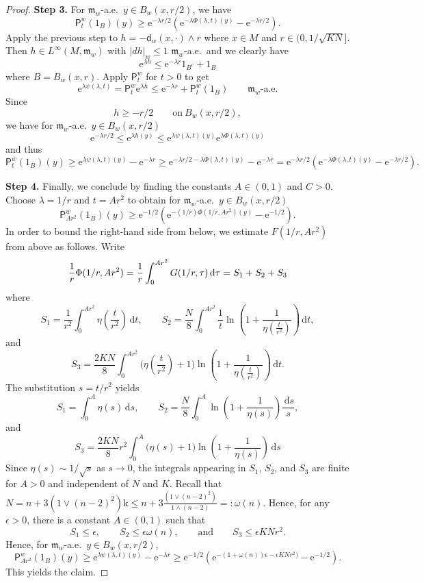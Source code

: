 \documentclass[10pt]{article}
\newcommand{\m}{\mathfrak{m}}
\newcommand{\M}{{\mathit{M}}}
\renewcommand{\d}{\,\mathrm{d}}
\newcommand{\e}{\mathrm{e}}
\renewcommand{\k}{\mathrm{k}}
\renewcommand{\P}{\mathsf{P}}
\newcommand{\One}{1}
\newcommand{\dist}{\mathsf{d}}
\theoremstyle{plain}
\theoremstyle{definition}
\begin{document}
\begin{proof}
\textbf{Step 3.} For $\m_w$-a.e.~$y\in B_w(x,r/2)$, we have  \[
\P_t^w(\One_B)(y)\geq \e^{-\lambda r/2}(\e^{-\lambda \Phi(\lambda,t)(y)}-\e^{-\lambda r/2 }).
\]
Apply the previous step to $h=-\dist_w(x,\cdot)\wedge r$ where $x \in M$ and $r \in (0,1/\sqrt{K N}]$. Then $h\in L^\infty(\M,\m_w)$ with $|dh|_w \le 1$ $\m_w$-a.e.~and we clearly have
\[
\e^{\lambda h}\leq \e^{-\lambda r}\One_{B^c}+\One_B
\]
where $B=B_w(x,r)$.  Apply $\P_t^w$ for $t>0$ to get 
\[
\e^{\lambda \psi(\lambda, t)}=\P_t^w\e^{\lambda h}\leq \e^{-\lambda r }+\P_t^w(\One_B) \qquad \text{$\m_w$-a.e.}
\]
Since
\[
h\geq -r/2 \qquad \text{on}\  B_w(x,r/2),
\]
we have for $\m_w$-a.e.~$y\in B_w(x,r/2)$
\[
\e^{-\lambda r/2}\leq \e^{\lambda h(y)}\leq \e^{\lambda\psi(\lambda,t)(y)}\e^{\lambda \Phi(\lambda,t)(y)}
\]
and thus
\[
\P_t^w(\One_B)(y)\geq \e^{\lambda \psi(\lambda, t)(y)}-\e^{-\lambda r }
\geq \e^{-\lambda r/2-\lambda \Phi(\lambda,t)(y)}-\e^{-\lambda r }
=\e^{-\lambda r/2}(\e^{-\lambda \Phi(\lambda,t)(y)}-\e^{-\lambda r/2 }).
\]

\textbf{Step 4.} Finally, we conclude by finding the constants $A\in(0,1)$ and $C>0$. Choose $\lambda=1/r$ and $t=Ar^2$ to obtain for $\m_w$-a.e.~$y\in B_w(x,r/2)$
\[
\P_{Ar^2}^w(\One_B)(y)
\geq\e^{- 1/2}(\e^{-(1/r) \Phi(1/r,Ar^2)(y)}-\e^{- 1/2 }).
\]
In order to bound the right-hand side from below, we estimate $F(1/r,Ar^2)$ from above as follows. Write
\[
    \frac{1}{r} \Phi(1/r,Ar^2)=\frac{1}{r}\int_0^{Ar^2}G(1/r,\tau)\d \tau
    \\
    =S_1+S_2+S_3
    \]
    where
    \[S_1=\frac{1}{r^2}\int_0^{Ar^2}
    \eta\left( \frac{t}{r^2}\right)\d t
    ,\qquad S_2=\frac{N}{8}\int_0^{Ar^2}\frac{1}{t}\ln\left(1+\frac{1}{\eta\left( \frac{t}{r^2}\right)}\right) \d t,\]
    and 
    \[
     S_3=\frac{2KN}{8}\int_0^{Ar^2}\bigg( \eta\left( \frac{t}{r^2}\right) +1 \bigg) \ln\left(1+\frac{1}{\eta\left( \frac{t}{r^2}\right)}\right)  \d t.
\]
The substitution $s=t/r^2$ yields 
\[
S_1=\int_{0}^{A}
    \eta(s) \d s
    ,\qquad S_2=\frac{N}{8}\int_0^A \ln \left(1 + \frac{1}{\eta(s)} \right) \frac{\d s}{s},
\]
and 
\[
     S_3=\frac{2KN}{8}r^2\int_0^{A}\bigg( \eta\left( s\right) +1 \bigg) \ln\left(1+\frac{1}{\eta\left(s\right)}\right)  \d s
\]
Since $\eta(s)\sim 1/\sqrt s$ as $s\to 0$, the integrals appearing in $S_1$, $S_2$, and $S_3$ are finite for $A>0$ and independent of $N$ and $K$. Recall that $N=n+3(1\vee (n-2)^2) \k\leq n+3\frac{(1\vee (n-2)^2)}{1\wedge (n-2)} =:\omega(n) $. Hence, for any $\epsilon>0$, there is a constant $A\in(0,1)$ such that 
\[
S_1\leq \epsilon, \qquad S_2\leq \epsilon \omega(n), \qquad \text{and}\qquad S_3\leq \epsilon KN r^2.
\]
Hence, for $\m_w$-a.e.~$y\in B_w(x,r/2)$,
\[
\P_{Ar^2}^w(\One_B)(y)\geq \e^{\lambda \psi(\lambda, t)(y)}-\e^{-\lambda r }
\geq \e^{-1/2}(\e^{-(1+\omega(n))\epsilon -\epsilon KNr^2)}-\e^{-1/2 }).
\]
This yields the claim.
\end{proof}
\end{document}
